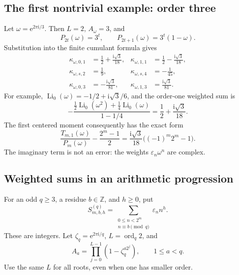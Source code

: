 \documentclass[11pt,letterpaper]{article}
\numberwithin{equation}{section}
\theoremstyle{definition}
\theoremstyle{remark}
\newcommand{\Z}{\mathbb Z}
\newcommand{\eps}{\varepsilon}
\newcommand{\ii}{\mathrm i}
\newcommand{\Li}{\operatorname{Li}}
\newcommand{\ord}{\operatorname{ord}}
\newcommand{\e}{\mathrm e}
\begin{document}
\subsection{The first nontrivial example: order three}
Let \(\omega=\e^{2\pi\ii/3}\). Then \(L=2\), \(A_\omega=3\), and
\begin{equation}
 P_{2t}(\omega)=3^t,\qquad P_{2t+1}(\omega)=3^t(1-\omega).
 \label{eq:omegaP}
\end{equation}
Substitution into the finite cumulant formula gives
\begin{align}
 \kappa_{\omega,0,1}&=\frac12+\frac{\ii\sqrt3}{18},&
 \kappa_{\omega,1,1}&=\frac12-\frac{\ii\sqrt3}{18},\\
 \kappa_{\omega,s,2}&=\frac19,&
 \kappa_{\omega,s,4}&=-\frac1{45},\\
 \kappa_{\omega,0,3}&=-\frac{\ii\sqrt3}{81},&
 \kappa_{\omega,1,3}&=\frac{\ii\sqrt3}{81}.
 \label{eq:omegakappa}
\end{align}
For example, \(\Li_0(\omega)=-1/2+\ii\sqrt3/6\), and the order-one weighted sum is
\[
 -\frac{\frac12\Li_0(\omega^2)+\frac14\Li_0(\omega)}{1-1/4}
 =\frac12+\frac{\ii\sqrt3}{18}.
\]
The first centered moment consequently has the exact form
\begin{equation}
 \frac{T_{m,1}(\omega)}{P_m(\omega)}-\frac{2^m-1}{2}
 =\frac{\ii\sqrt3}{18}\bigl((-1)^m2^m-1\bigr).
 \label{eq:omegacenter}
\end{equation}
The imaginary term is not an error: the weights \(\eps_n\omega^n\) are complex.

\subsection{Weighted sums in an arithmetic progression}
For an odd \(q\geq3\), a residue \(b\in\Z\), and \(h\geq0\), put
\begin{equation}
 S^{(q)}_{m,b,h}=\sum_{\substack{0\leq n<2^m\\n\equiv b\pmod q}}
                  \eps_n n^h.
 \label{eq:progression}
\end{equation}
These are integers. Let \(\zeta_q=\e^{2\pi\ii/q}\), \(L=\ord_q2\), and
\[
 A_a=\prod_{j=0}^{L-1}(1-\zeta_q^{a2^j}),\qquad 1\leq a<q.
\]
Use the same \(L\) for all roots, even when one has smaller order.
\end{document}
